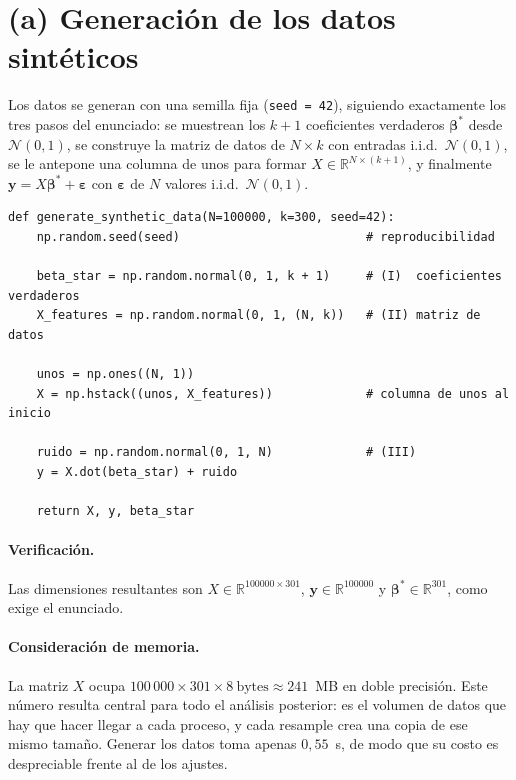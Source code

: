 \documentclass[11pt,letterpaper]{article}
\begin{document}
\section{(a) Generación de los datos sintéticos}
\label{sec:a}

Los datos se generan con una semilla fija (\texttt{seed = 42}), siguiendo exactamente
los tres pasos del enunciado: se muestrean los $k+1$ coeficientes verdaderos
$\boldsymbol{\beta}^*$ desde $\mathcal{N}(0,1)$, se construye la matriz de datos de
$N \times k$ con entradas i.i.d.\ $\mathcal{N}(0,1)$, se le antepone una columna de
unos para formar $X \in \mathbb{R}^{N \times (k+1)}$, y finalmente
$\mathbf{y} = X\boldsymbol{\beta}^* + \boldsymbol{\varepsilon}$ con
$\boldsymbol{\varepsilon}$ de $N$ valores i.i.d.\ $\mathcal{N}(0,1)$.

\begin{lstlisting}[caption={Generación de los datos sintéticos (\texttt{data\_utils.py}).}]
def generate_synthetic_data(N=100000, k=300, seed=42):
    np.random.seed(seed)                          # reproducibilidad

    beta_star = np.random.normal(0, 1, k + 1)     # (I)  coeficientes verdaderos
    X_features = np.random.normal(0, 1, (N, k))   # (II) matriz de datos

    unos = np.ones((N, 1))
    X = np.hstack((unos, X_features))             # columna de unos al inicio

    ruido = np.random.normal(0, 1, N)             # (III)
    y = X.dot(beta_star) + ruido

    return X, y, beta_star
\end{lstlisting}

\paragraph{Verificación.} Las dimensiones resultantes son
$X \in \mathbb{R}^{100000 \times 301}$, $\mathbf{y} \in \mathbb{R}^{100000}$ y
$\boldsymbol{\beta}^* \in \mathbb{R}^{301}$, como exige el enunciado.

\paragraph{Consideración de memoria.} La matriz $X$ ocupa
$100\,000 \times 301 \times 8~\text{bytes} \approx 241$~MB en doble precisión. Este
número resulta central para todo el análisis posterior: es el volumen de datos que hay
que hacer llegar a cada proceso, y cada resample crea una copia de ese mismo tamaño.
Generar los datos toma apenas $0{,}55$~s, de modo que su costo es despreciable frente
al de los ajustes.
\end{document}
